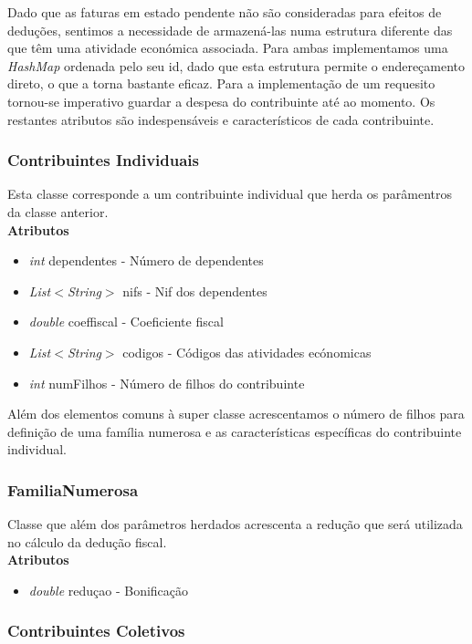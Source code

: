 \documentclass[10pt,a4paper]{article}
\begin{document}
Dado que as faturas em estado pendente não são consideradas para efeitos de deduções, sentimos a necessidade de armazená-las numa estrutura diferente das que têm uma atividade económica associada. Para ambas implementamos uma \textit{HashMap} ordenada pelo seu id, dado que esta estrutura permite o endereçamento direto, o que a torna bastante eficaz. Para a implementação de um requesito tornou-se imperativo guardar a despesa do contribuinte até ao momento. Os restantes atributos são indespensáveis e característicos de cada contribuinte.

\subsubsection{Contribuintes Individuais}

Esta classe corresponde a um contribuinte individual que herda os parâmentros da classe anterior.\\

{\bf{Atributos}}
\begin{itemize}
 \item \textit{int} dependentes - Número de dependentes
 \item \textit{List$<$String$>$} nifs - Nif dos dependentes
 \item \textit{double} coeffiscal - Coeficiente fiscal
 \item \textit{List$<$String$>$} codigos - Códigos das atividades ecónomicas
 \item \textit{int} numFilhos - Número de filhos do contribuinte
\end{itemize}

Além dos elementos comuns à super classe acrescentamos o número de filhos para definição de uma família numerosa e as características específicas do contribuinte individual.

\subsubsection{FamiliaNumerosa}
Classe que além dos parâmetros herdados acrescenta a redução que será utilizada no cálculo da dedução fiscal.\\

{\bf{Atributos}}
\begin{itemize}
 \item \textit{double} reduçao - Bonificação
\end{itemize}

\subsubsection{Contribuintes Coletivos}
\end{document}
